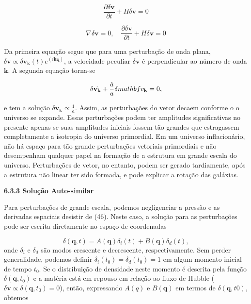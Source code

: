 \documentclass[a4paper,12pt]{article}
\begin{document}
$$\dfrac{\partial\delta\mathbf{v}}{\partial t} + H\delta\mathbf{v} = 0$$
\newline

\begin{equation}
	\nabla\delta\mathbf{v} = 0 , \quad \dfrac{\partial\delta\mathbf{v}}{\partial t } + H\delta\mathbf{v} = 0
\end{equation}

Da primeira equação segue que para uma perturbação de onda plana, $\delta\mathbf{v} \propto \delta\mathbf{v}_\mathbf{k} (t)e^{(i\mathbf{kq})}$, a velocidade peculiar $\delta\mathbf{v}$ é perpendicular ao número de onda $\mathbf{k}$. A segunda equação torna-se

\begin{equation}
	\delta\dot{\mathbf{v}_\mathbf{k}} + \dfrac{\dot{a}}{a}\delta\\mathbf{v}_\mathbf{k}=0,
\end{equation}

e tem a solução $\delta\mathbf{v_k} \propto \frac{1}{a}$. Assim, as perturbações do vetor decaem conforme o
o universo se expande. Essas perturbações podem ter amplitudes significativas no presente
apenas se suas amplitudes iniciais fossem tão grandes que estragassem completamente a isotropia do universo primordial. Em um universo inflacionário, não há espaço para tão grande
perturbações vetoriais primordiais e não desempenham qualquer papel na formação de
a estrutura em grande escala do universo. Perturbações de vetor, no entanto, podem ser
gerado tardiamente, após a estrutura não linear ter sido formada, e pode explicar
a rotação das galáxias.

\begin{center}
	\textbf{6.3.3 Solução Auto-similar}
\end{center}
Para perturbações de grande escala, podemos negligenciar a pressão e as derivadas espaciais
desistir de (46). Neste caso, a solução para as perturbações pode ser escrita diretamente
no espaço de coordenadas

\begin{equation}
	\delta (\mathbf{q},t ) = A(\mathbf{q}) \delta_i (t)+B(\mathbf{q})\delta_d (t),
\end{equation}
onde $\delta_i$ e $\delta_d$ são modos crescente e decrescente, respectivamente. Sem perder
generalidade, podemos definir $\delta_i (t_0) = \delta_d (t_0) = 1$ em algum momento inicial de tempo $t_0$. Se o
distribuição de densidade neste momento é descrita pela função $\delta(\mathbf{q}, t_0)$ e a matéria
está em repouso em relação ao fluxo de Hubble ($\delta\mathbf{v} \propto \delta (\mathbf{q}, t_0) = 0$), então, expressando $A (q)$
e $B (\mathbf{q})$ em termos de $\delta (\mathbf{q}, t0)$, obtemos
\end{document}
